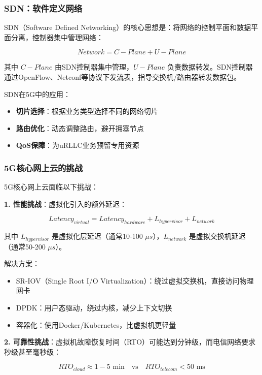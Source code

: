 \subsubsection{SDN：软件定义网络}

SDN（Software Defined Networking）的核心思想是：将网络的控制平面和数据平面分离，控制器集中管理网络：

\begin{equation}
Network = C-Plane + U-Plane
\end{equation}

其中 $C-Plane$ 由SDN控制器集中管理，$U-Plane$ 负责数据转发。SDN控制器通过OpenFlow、Netconf等协议下发流表，指导交换机/路由器转发数据包。

SDN在5G中的应用：
\begin{itemize}
    \item \textbf{切片选择}：根据业务类型选择不同的网络切片
    \item \textbf{路由优化}：动态调整路由，避开拥塞节点
    \item \textbf{QoS保障}：为uRLLC业务预留专用资源
\end{itemize}

\subsubsection{5G核心网上云的挑战}

5G核心网上云面临以下挑战：

\textbf{1. 性能挑战}：虚拟化引入的额外延迟：

\begin{equation}
Latency_{virtual} = Latency_{hardware} + L_{hypervisor} + L_{network}
\end{equation}

其中 $L_{hypervisor}$ 是虚拟化层延迟（通常10-100 $\mu s$），$L_{network}$ 是虚拟交换机延迟（通常50-200 $\mu s$）。

解决方案：
\begin{itemize}
    \item SR-IOV（Single Root I/O Virtualization）：绕过虚拟交换机，直接访问物理网卡
    \item DPDK：用户态驱动，绕过内核，减少上下文切换
    \item 容器化：使用Docker/Kubernetes，比虚拟机更轻量
\end{itemize}

\textbf{2. 可靠性挑战}：虚拟机故障恢复时间（RTO）可能达到分钟级，而电信网络要求秒级甚至毫秒级：

\begin{equation}
RTO_{cloud} \approx 1-5 \text{ min} \quad \text{vs} \quad RTO_{telecom} < 50 \text{ ms}
\end{equation}

